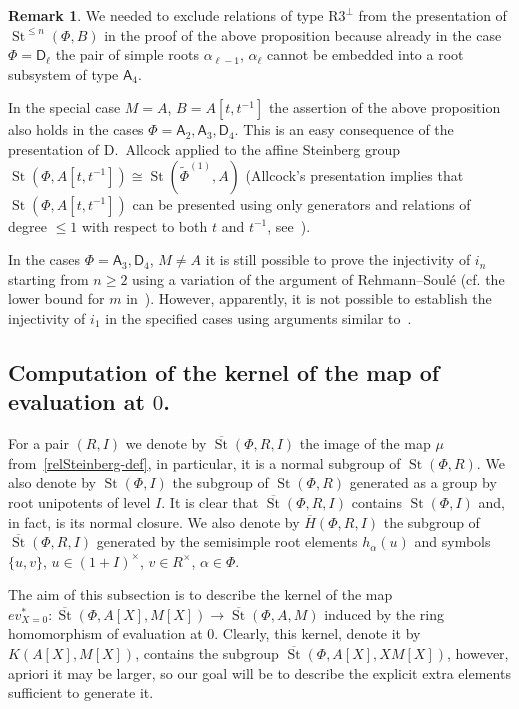 \documentclass[oneside, 8pt]{amsart}
\theoremstyle{remark}
\theoremstyle{definition}
\newtheorem{rem}[lemma]{Remark}
\DeclareMathOperator{\St}{St}
\newcommand{\inv}{^{-1}}
\newcommand{\rA}{\mathsf{A}}
\newcommand{\rD}{\mathsf{D}}
\numberwithin{equation}{section}
\begin{document}
\begin{rem}
 We needed to exclude relations of type $\text{R3}^\bot$ from the presentation of $\St^{\leq n}(\Phi, B)$ in the proof of the above proposition because already in the case $\Phi=\rD_\ell$ the pair of simple roots $\alpha_{\ell-1}$, $\alpha_{\ell}$ cannot be embedded into a root subsystem of type $\rA_4$.
 
 In the special case $M=A$, $B = A[t, t\inv]$ the assertion of the above proposition also holds in the cases $\Phi=\rA_2, \rA_3, \rD_4$. This is an easy consequence of the presentation of D.~Allcock applied to the affine Steinberg group $\St(\Phi, A[t, t\inv]) \cong \St(\widetilde{\Phi}^{(1)}, A)$ (Allcock's presentation implies that $\St(\Phi, A[t, t\inv])$ can be presented using only generators and relations of degree $\leq 1$ with respect to both $t$ and $t^{-1}$, see~\cite[Corollary~1.3]{A13}).
 
 In the cases $\Phi = \rA_3, \rD_4$, $M \neq A$ it is still possible to prove the injectivity of $i_n$ starting from $n\geq 2$ using a variation of the argument of Rehmann--Soul{\'e} (cf. the lower bound for $m$ in~\cite[3.2.1]{RS76}). However, apparently, it is not possible to establish the injectivity of $i_1$ in the specified cases using arguments similar to~\cite{RS76}.
\end{rem}


\subsection{Computation of the kernel of the map of evaluation at \texorpdfstring{$0$}{0}.}
For a pair $(R, I)$ we denote by $\overline{\St}(\Phi, R, I)$ the image of the map $\mu$ from~\eqref{relSteinberg-def}, in particular, it is a normal subgroup of $\St(\Phi, R)$.
We also denote by $\St(\Phi, I)$ the subgroup of $\St(\Phi, R)$ generated as a group by root unipotents of level $I$.
It is clear that $\overline{\St}(\Phi, R, I)$ contains $\St(\Phi, I)$ and, in fact, is its normal closure.
We also denote by $\overline{H}(\Phi, R, I)$ the subgroup of $\overline{\St}(\Phi, R, I)$ generated by the semisimple root elements $h_\alpha(u)$ and symbols $\{u, v\}$, $u \in (1+I)^\times$, $v \in R^\times$, $\alpha\in \Phi$.

The aim of this subsection is to describe the kernel of the map $ev_{X=0}^*\colon\overline{\St}(\Phi, A[X], M[X]) \to \overline{\St}(\Phi, A, M)$
induced by the ring homomorphism of evaluation at $0$. Clearly, this kernel, denote it by $K(A[X], M[X])$, contains the subgroup $\overline{\St}(\Phi, A[X], XM[X])$, however, apriori it may be larger, so our goal will be to describe the explicit extra elements sufficient to generate it.
\end{document}
